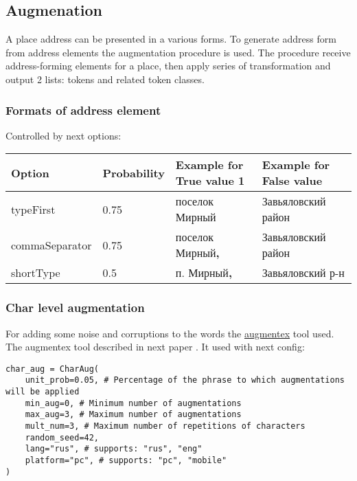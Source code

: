 \documentclass{article}
\begin{document}
\subsection{Augmenation}

A place address can be presented in a various forms.
To generate address form from address elements the augmentation procedure is used.
The procedure receive address-forming elements for a place, then apply series of transformation and output 2 lists: tokens and related token classes.

\subsubsection{Formats of address element}

Controlled by next options:

\begin{center}
    \begin{tabular}{| l | l | l |  l | }
        \hline
        Option & Probability & Example for True value 1 & Example for False value \\
        \hline
        typeFirst & 0.75 & поселок Мирный & Завьяловский район  \\
        commaSeparator & 0.75 & поселок Мирный\textbf{,} & Завьяловский район  \\
        shortType & 0.5 & п. Мирный\textbf{,} & Завьяловский р-н  \\
        \hline
    \end{tabular}
\end{center}



\subsubsection{Char level augmentation}

For adding some noise and corruptions to the words the \href{https://github.com/ai-forever/augmentex}{augmentex} tool used.
The augmentex tool described in next paper \cite{martynov2023augmentation}.
It used with next config:

\begin{verbatim}
char_aug = CharAug(
    unit_prob=0.05, # Percentage of the phrase to which augmentations will be applied
    min_aug=0, # Minimum number of augmentations
    max_aug=3, # Maximum number of augmentations
    mult_num=3, # Maximum number of repetitions of characters
    random_seed=42,
    lang="rus", # supports: "rus", "eng"
    platform="pc", # supports: "pc", "mobile"
)

\end{verbatim}
\end{document}

